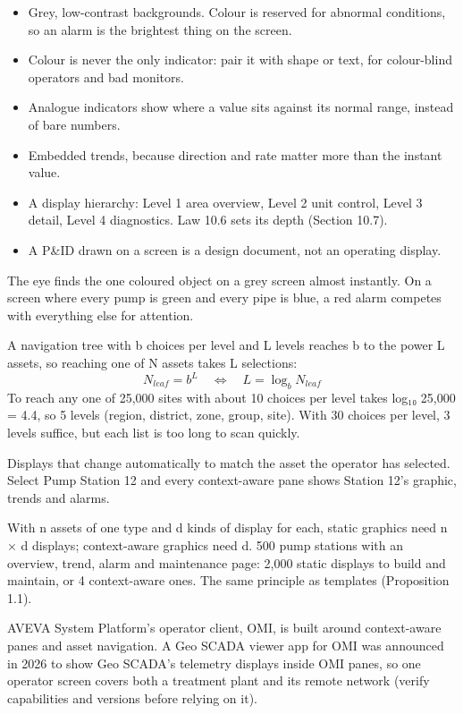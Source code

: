 \begin{itemize}
\item Grey, low-contrast backgrounds. Colour is reserved for abnormal conditions, so an alarm is the brightest thing on the screen.
\item Colour is never the only indicator: pair it with shape or text, for colour-blind operators and bad monitors.
\item Analogue indicators show where a value sits against its normal range, instead of bare numbers.
\item Embedded trends, because direction and rate matter more than the instant value.
\item A display hierarchy: Level 1 area overview, Level 2 unit control, Level 3 detail, Level 4 diagnostics. Law 10.6 sets its depth (Section 10.7).
\item A P\&ID drawn on a screen is a design document, not an operating display.
\end{itemize}
 The eye finds the one coloured object on a grey screen almost instantly. On a screen where every pump is green and every pipe is blue, a red alarm competes with everything else for attention.

 A navigation tree with b choices per level and L levels reaches b to the power L assets, so reaching one of N assets takes L selections:
\[ N_{leaf} = b^L \quad\Longleftrightarrow\quad L = \log_b N_{leaf} \]
To reach any one of 25,000 sites with about 10 choices per level takes log₁₀ 25,000 = 4.4, so 5 levels (region, district, zone, group, site). With 30 choices per level, 3 levels suffice, but each list is too long to scan quickly.

 Displays that change automatically to match the asset the operator has selected. Select Pump Station 12 and every context-aware pane shows Station 12's graphic, trends and alarms.

 With n assets of one type and d kinds of display for each, static graphics need n × d displays; context-aware graphics need d. 500 pump stations with an overview, trend, alarm and maintenance page: 2,000 static displays to build and maintain, or 4 context-aware ones. The same principle as templates (Proposition 1.1).

 AVEVA System Platform's operator client, OMI, is built around context-aware panes and asset navigation. A Geo SCADA viewer app for OMI was announced in 2026 to show Geo SCADA's telemetry displays inside OMI panes, so one operator screen covers both a treatment plant and its remote network (verify capabilities and versions before relying on it).

